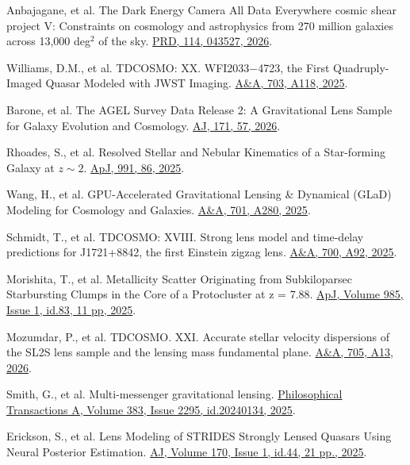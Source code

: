 \documentclass[margin, line]{res}
\begin{document}
\begin{resume}
\begin{etaremune}
	\item Anbajagane, et al. The Dark Energy Camera All Data Everywhere cosmic shear project V: Constraints on cosmology and astrophysics from 270 million galaxies across 13,000 deg$^2$ of the sky. \href{https://ui.adsabs.harvard.edu/abs/2026PhRvD.114d3527A/abstract}{PRD, 114, 043527, 2026}.
	\item Williams, D.M., et al. TDCOSMO: XX. WFI2033$-$4723, the First Quadruply-Imaged Quasar Modeled with JWST Imaging. \href{https://ui.adsabs.harvard.edu/abs/2025A\%26A...703A.118W/abstract}{A\&A, 703, A118, 2025}.
	\item Barone, et al. The AGEL Survey Data Release 2: A Gravitational Lens Sample for Galaxy Evolution and Cosmology. \href{https://ui.adsabs.harvard.edu/abs/2026AJ....171...57B/abstract}{AJ, 171, 57, 2026}.
	\item Rhoades, S., et al. Resolved Stellar and Nebular Kinematics of a Star-forming Galaxy at $z\sim2$. \href{https://ui.adsabs.harvard.edu/abs/2025ApJ...991...86R/abstract}{ApJ, 991, 86, 2025}.
	\item Wang, H., et al. GPU-Accelerated Gravitational Lensing \& Dynamical (GLaD) Modeling for Cosmology and Galaxies. \href{https://ui.adsabs.harvard.edu/abs/2025A\%26A...701A.280W/abstract}{A\&A, 701, A280, 2025}.
	\item Schmidt, T., et al. TDCOSMO: XVIII. Strong lens model and time-delay predictions for J1721+8842, the first Einstein zigzag lens. \href{https://ui.adsabs.harvard.edu/abs/2025A\%26A...700A..92S/abstract}{A\&A, 700, A92, 2025}.
	\item Morishita, T., et al. Metallicity Scatter Originating from Subkiloparsec Starbursting Clumps in the Core of a Protocluster at z = 7.88. \href{https://ui.adsabs.harvard.edu/abs/2025ApJ...985...83M/abstract}{ApJ, Volume 985, Issue 1, id.83, 11 pp, 2025}.
	\item Mozumdar, P., et al. TDCOSMO. XXI. Accurate stellar velocity dispersions of the SL2S lens sample and the lensing mass fundamental plane. \href{https://ui.adsabs.harvard.edu/abs/2026A\%26A...705A..13M/abstract}{A\&A, 705, A13, 2026}.
	\item Smith, G., et al. Multi-messenger gravitational lensing. \href{https://ui.adsabs.harvard.edu/abs/2025RSPTA.38340134S/abstract}{Philosophical Transactions A, Volume 383, Issue 2295, id.20240134, 2025}.
	\item Erickson, S., et al. Lens Modeling of STRIDES Strongly Lensed Quasars Using Neural Posterior Estimation. \href{https://ui.adsabs.harvard.edu/abs/2025AJ....170...44E/abstract}{AJ, Volume 170, Issue 1, id.44, 21 pp., 2025}.

\end{etaremune}
\end{resume}
\end{document}
